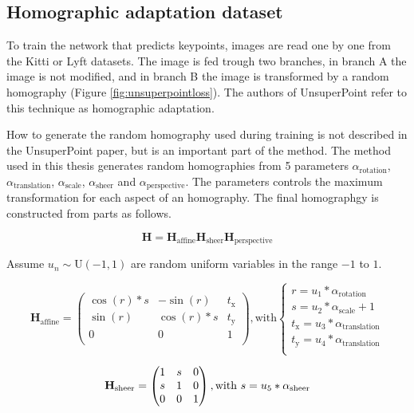 \subsection{Homographic adaptation dataset}

To train the network that predicts keypoints, images are read one by one from the Kitti or Lyft datasets. The image is fed trough two branches, in branch A the image is not modified, and in branch B the image is transformed by a random homography (Figure \ref{fig:unsuperpointloss}). The authors of UnsuperPoint refer to this technique as homographic adaptation.

How to generate the random homography used during training is not described in the UnsuperPoint paper, but is an important part of the method. The method used in this thesis generates random homographies from 5 parameters $\alpha_{\mathrm{rotation}}$, $\alpha_{\mathrm{translation}}$, $\alpha_{\mathrm{scale}}$, $\alpha_{\mathrm{sheer}}$ and $\alpha_{\mathrm{perspective}}$. The parameters controls the maximum transformation for each aspect of an homography. The final homographgy is constructed from parts as follows.

\begin{equation}
\textbf{H} = \textbf{H}_{\mathrm{affine}} \textbf{H}_{\mathrm{sheer}} \textbf{H}_{\mathrm{perspective}}
\end{equation}

Assume $u_n \sim \mathrm{U}(-1,1)$ are random uniform variables in the range $-1$ to $1$.

\begin{equation}
\textbf{H}_{\mathrm{affine}} = 
\begin{pmatrix}
\cos(r)*s & -\sin(r) & t_\mathrm{x} \\
\sin(r)& \cos(r)*s & t_\mathrm{y} \\
0 & 0 & 1 \\
\end{pmatrix}
, \text{with}
\begin{cases}
r=u_1*\alpha_{\mathrm{rotation}} \\
s=u_2*\alpha_{\mathrm{scale}}+1 \\
t_\mathrm{x}=u_3*\alpha_{\mathrm{translation}} \\
t_\mathrm{y}=u_4*\alpha_{\mathrm{translation}} \\
\end{cases}
\end{equation}

\begin{equation}
\textbf{H}_{\mathrm{sheer}} = 
\begin{pmatrix}
1 & s & 0 \\
s & 1 & 0 \\
0 & 0 & 1 \\
\end{pmatrix}
, \text{with}
\ s=u_5*\alpha_{\mathrm{sheer}} \\
\end{equation}

